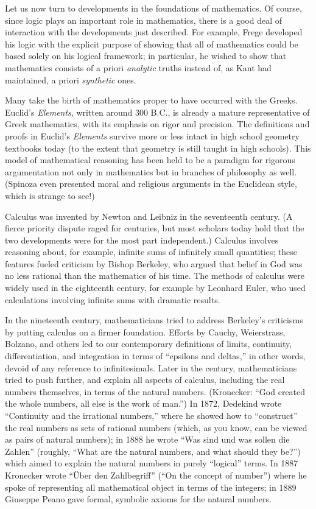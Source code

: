 \documentclass[../../../include/open-logic-section]{subfiles}
\begin{document}
Let us now turn to developments in the foundations of mathematics. Of
course, since logic plays an important role in mathematics, there is a
good deal of interaction with the developments just described. For
example, Frege developed his logic with the explicit purpose of
showing that all of mathematics could be based solely on his logical
framework; in particular, he wished to show that mathematics consists
of a priori \emph{analytic} truths instead of, as Kant had maintained,
a priori \emph{synthetic} ones.

Many take the birth of mathematics proper to have occurred with the
Greeks. Euclid's \emph{Elements}, written around 300 B.C., is already
a mature representative of Greek mathematics, with its emphasis on
rigor and precision. The definitions and proofs in Euclid's
\emph{Elements} survive more or less intact in high school geometry
textbooks today (to the extent that geometry is still taught in high
schools). This model of mathematical reasoning has been held to be a
paradigm for rigorous argumentation not only in mathematics but in
branches of philosophy as well. (Spinoza even presented moral and
religious arguments in the Euclidean style, which is strange to see!)

Calculus was invented by Newton and Leibniz in the seventeenth
century. (A fierce priority dispute raged for centuries, but most
scholars today hold that the two developments were for the most part
independent.)  Calculus involves reasoning about, for example,
infinite sums of infinitely small quantities; these features fueled
criticism by Bishop Berkeley, who argued that belief in God was no
less rational than the mathematics of his time. The methods of
calculus were widely used in the eighteenth century, for example by
Leonhard Euler, who used calculations involving infinite sums with
dramatic results.

In the nineteenth century, mathematicians tried to address Berkeley's
criticisms by putting calculus on a firmer foundation. Efforts by
Cauchy, Weierstrass, Bolzano, and others led to our contemporary
definitions of limits, continuity, differentiation, and integration in
terms of ``epsilons and deltas,'' in other words, devoid of any
reference to infinitesimals. Later in the century, mathematicians
tried to push further, and explain all aspects of calculus, including
the real numbers themselves, in terms of the natural numbers.
(Kronecker: ``God created the whole numbers, all else is the work of
man.'') In 1872, Dedekind wrote ``Continuity and the irrational
numbers,'' where he showed how to ``construct'' the real numbers as
sets of rational numbers (which, as you know, can be viewed as pairs
of natural numbers); in 1888 he wrote ``Was sind und was sollen die
Zahlen'' (roughly, ``What are the natural numbers, and what should
they be?'') which aimed to explain the natural numbers in purely
``logical'' terms. In 1887 Kronecker wrote ``\"Uber den Zahlbegriff''
(``On the concept of number'') where he spoke of representing all
mathematical object in terms of the integers; in 1889 Giuseppe Peano
gave formal, symbolic axioms for the natural numbers.
\end{document}
